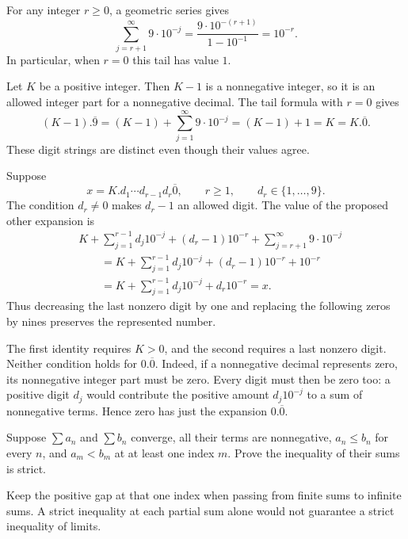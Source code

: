 For any integer $r\ge0$, a geometric series gives
\[
 \sum_{j=r+1}^{\infty}9\cdot10^{-j}
 =\frac{9\cdot10^{-(r+1)}}{1-10^{-1}}
 =10^{-r}.
\]
In particular, when $r=0$ this tail has value $1$.

Let $K$ be a positive integer. Then $K-1$ is a nonnegative integer,
so it is an allowed integer part for a nonnegative decimal. The
tail formula with $r=0$ gives
\[
 (K-1).\overline9
 =(K-1)+\sum_{j=1}^{\infty}9\cdot10^{-j}
 =(K-1)+1=K=K.\overline0.
\]
These digit strings are distinct even though their values agree.

Suppose
\[
 x=K.d_1\cdots d_{r-1}d_r\overline0,\qquad r\ge1,
 \qquad d_r\in\{1,\ldots,9\}.
\]
The condition $d_r\ne0$ makes $d_r-1$ an allowed digit. The value
of the proposed other expansion is
\[
 \begin{aligned}
 &K+\sum_{j=1}^{r-1}d_j10^{-j}
       +(d_r-1)10^{-r}+\sum_{j=r+1}^{\infty}9\cdot10^{-j}\\
 &\qquad=K+\sum_{j=1}^{r-1}d_j10^{-j}
       +(d_r-1)10^{-r}+10^{-r}\\
 &\qquad=K+\sum_{j=1}^{r-1}d_j10^{-j}+d_r10^{-r}=x.
 \end{aligned}
\]
Thus decreasing the last nonzero digit by one and replacing the
following zeros by nines preserves the represented number.

The first identity requires $K>0$, and the second requires a last
nonzero digit. Neither condition holds for $0.\overline0$.
Indeed, if a nonnegative decimal represents zero, its nonnegative
integer part must be zero. Every digit must then be zero too:
a positive digit $d_j$ would contribute the positive amount
$d_j10^{-j}$ to a sum of nonnegative terms. Hence zero has just
the expansion $0.\overline0$.

\goal Suppose $\sum a_n$ and $\sum b_n$ converge, all their terms
are nonnegative, $a_n\le b_n$ for every $n$, and $a_m<b_m$ at
at least one index $m$. Prove the inequality of their sums is strict.

\idea Keep the positive gap at that one index when passing from
finite sums to infinite sums. A strict inequality at each partial
sum alone would not guarantee a strict inequality of limits.

